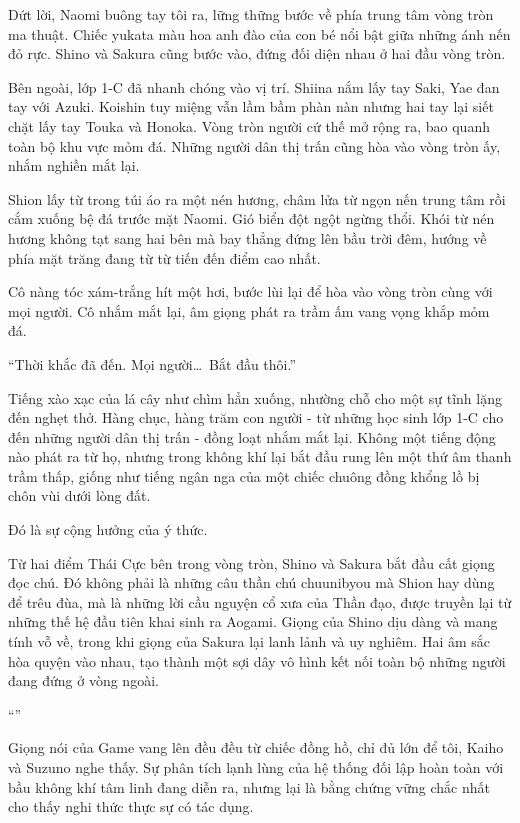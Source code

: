 \documentclass[../main.tex]{subfiles}
\begin{document}
Dứt lời, Naomi buông tay tôi ra, lững thững bước về phía trung tâm vòng tròn ma thuật. Chiếc yukata màu hoa anh đào của con bé nổi bật giữa những ánh nến đỏ rực. Shino và Sakura cũng bước vào, đứng đối diện nhau ở hai đầu vòng tròn.

Bên ngoài, lớp 1-C đã nhanh chóng vào vị trí. Shiina nắm lấy tay Saki, Yae đan tay với Azuki. Koishin tuy miệng vẫn lầm bầm phàn nàn nhưng hai tay lại siết chặt lấy tay Touka và Honoka. Vòng tròn người cứ thế mở rộng ra, bao quanh toàn bộ khu vực mỏm đá. Những người dân thị trấn cũng hòa vào vòng tròn ấy, nhắm nghiền mắt lại.

Shion lấy từ trong túi áo ra một nén hương, châm lửa từ ngọn nến trung tâm rồi cắm xuống bệ đá trước mặt Naomi. Gió biển đột ngột ngừng thổi. Khói từ nén hương không tạt sang hai bên mà bay thẳng đứng lên bầu trời đêm, hướng về phía mặt trăng đang từ từ tiến đến điểm cao nhất.

Cô nàng tóc xám-trắng hít một hơi, bước lùi lại để hòa vào vòng tròn cùng với mọi người. Cô nhắm mắt lại, âm giọng phát ra trầm ấm vang vọng khắp mỏm đá.

``Thời khắc đã đến. Mọi người\dots\ Bắt đầu thôi.''

Tiếng xào xạc của lá cây như chìm hẳn xuống, nhường chỗ cho một sự tĩnh lặng đến nghẹt thở. Hàng chục, hàng trăm con người - từ những học sinh lớp 1-C cho đến những người dân thị trấn - đồng loạt nhắm mắt lại. Không một tiếng động nào phát ra từ họ, nhưng trong không khí lại bắt đầu rung lên một thứ âm thanh trầm thấp, giống như tiếng ngân nga của một chiếc chuông đồng khổng lồ bị chôn vùi dưới lòng đất.

Đó là sự cộng hưởng của ý thức.

Từ hai điểm Thái Cực bên trong vòng tròn, Shino và Sakura bắt đầu cất giọng đọc chú. Đó không phải là những câu thần chú chuunibyou mà Shion hay dùng để trêu đùa, mà là những lời cầu nguyện cổ xưa của Thần đạo, được truyền lại từ những thế hệ đầu tiên khai sinh ra Aogami. Giọng của Shino dịu dàng và mang tính vỗ về, trong khi giọng của Sakura lại lanh lảnh và uy nghiêm. Hai âm sắc hòa quyện vào nhau, tạo thành một sợi dây vô hình kết nối toàn bộ những người đang đứng ở vòng ngoài.

``''

Giọng nói của Game vang lên đều đều từ chiếc đồng hồ, chỉ đủ lớn để tôi, Kaiho và Suzuno nghe thấy. Sự phân tích lạnh lùng của hệ thống đối lập hoàn toàn với bầu không khí tâm linh đang diễn ra, nhưng lại là bằng chứng vững chắc nhất cho thấy nghi thức thực sự có tác dụng.
\end{document}
